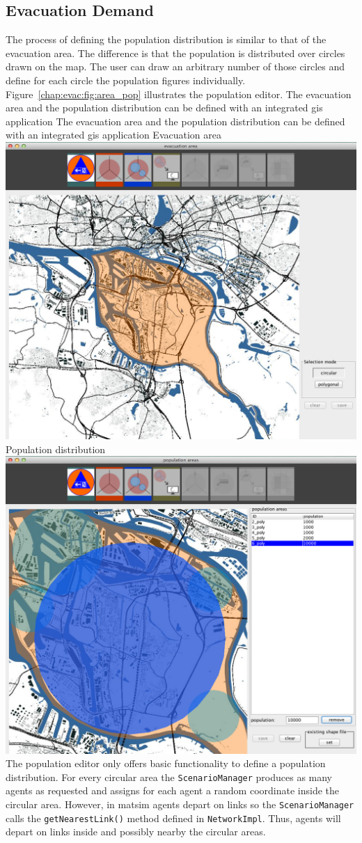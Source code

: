 \subsection{Evacuation Demand}
The process of defining the population distribution is similar to that of the evacuation area. The difference is that the population is distributed over circles drawn on the map. The user can draw an arbitrary number of those circles and define for each circle the population figures individually. Figure~\ref{chap:evac:fig:area_pop} illustrates the population editor. 
%
\createfigure%
{The evacuation area and the population distribution can be defined with an integrated \gls{gis} application}%
{The evacuation area and the population distribution can be defined with an integrated \gls{gis} application}%
{\label{chap:evac:fig:area_pop}}%
{%
  \createsubfigure%
  {Evacuation area}%
{\includegraphics[width=.475\linewidth]{extending/figures/Evacuation/evac_area_sel}}
  {}%
  {}%
  \createsubfigure%
  {Population distribution}%
{\includegraphics[width=.475\linewidth]{extending/figures/Evacuation/pop_sel}}
  {}%
  {}%
}%
  {}%
%
The population editor only offers basic functionality to define a population distribution. For every circular area the \lstinline|ScenarioManager| produces as many agents as requested and assigns for each agent a random coordinate inside the circular area. However, in \gls{matsim} agents depart on links so the \lstinline|ScenarioManager| calls the \lstinline|getNearestLink()| method defined in \lstinline|NetworkImpl|. Thus, agents will depart on links inside and possibly nearby the circular areas. 

